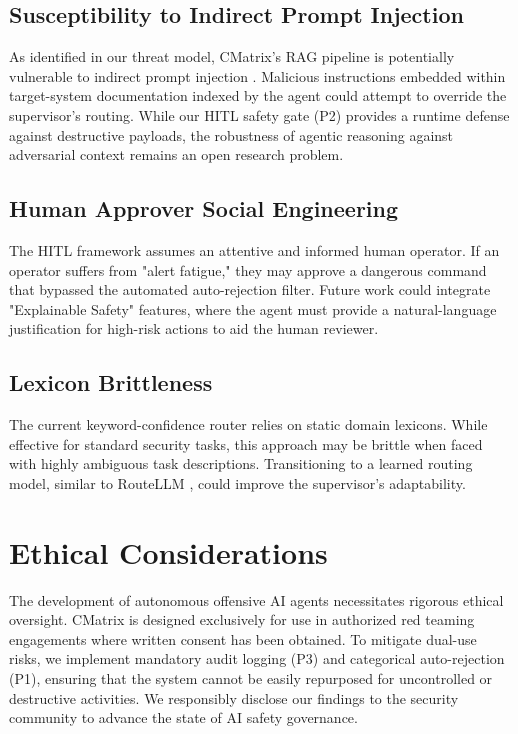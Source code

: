 \documentclass[conference,compsoc]{IEEEtran}
\begin{document}
\subsection{Susceptibility to Indirect Prompt Injection}
As identified in our threat model, CMatrix's RAG pipeline is potentially vulnerable to indirect prompt injection \cite{greshake}. Malicious instructions embedded within target-system documentation indexed by the agent could attempt to override the supervisor's routing. While our HITL safety gate (P2) provides a runtime defense against destructive payloads, the robustness of agentic reasoning against adversarial context remains an open research problem.

\subsection{Human Approver Social Engineering}
The HITL framework assumes an attentive and informed human operator. If an operator suffers from "alert fatigue," they may approve a dangerous command that bypassed the automated auto-rejection filter. Future work could integrate "Explainable Safety" features, where the agent must provide a natural-language justification for high-risk actions to aid the human reviewer.

\subsection{Lexicon Brittleness}
The current keyword-confidence router relies on static domain lexicons. While effective for standard security tasks, this approach may be brittle when faced with highly ambiguous task descriptions. Transitioning to a learned routing model, similar to RouteLLM \cite{routellm}, could improve the supervisor's adaptability.

\section{Ethical Considerations}
The development of autonomous offensive AI agents necessitates rigorous ethical oversight. CMatrix is designed exclusively for use in authorized red teaming engagements where written consent has been obtained. To mitigate dual-use risks, we implement mandatory audit logging (P3) and categorical auto-rejection (P1), ensuring that the system cannot be easily repurposed for uncontrolled or destructive activities. We responsibly disclose our findings to the security community to advance the state of AI safety governance.
\end{document}
